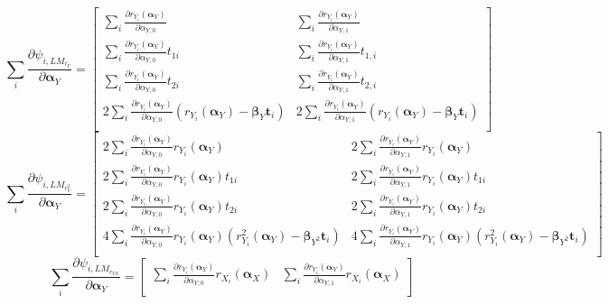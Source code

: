 \documentclass[]{article}
\begin{document}
{\small
{\[
\sum_i\frac{\partial \psi_{i,LM_{r_Y}}}{\partial \pmb{\alpha}_Y} = 
	\begin{bmatrix}
		\sum_i\frac{\partial r_{Y_i}(\pmb{\alpha}_Y)}{\partial \alpha_{Y,0}} & \sum_i\frac{\partial r_{Y_i}(\pmb{\alpha}_Y)}{\partial \alpha_{Y,1}}\\
		\sum_i\frac{\partial r_{Y_i}(\pmb{\alpha}_Y)}{\partial \alpha_{Y,0}}t_{1i} & \sum_i\frac{\partial r_{Y_i}(\pmb{\alpha}_Y)}{\partial \alpha_{Y,1}}t_{1,i}\\
		\sum_i\frac{\partial r_{Y_i}(\pmb{\alpha}_Y)}{\partial \alpha_{Y,0}}t_{2i} & \sum_i\frac{\partial r_{Y_i}(\pmb{\alpha}_Y)}{\partial \alpha_{Y,1}}t_{2,i}\\
		2\sum_i\frac{\partial r_{Y_i}(\pmb{\alpha}_Y)}{\partial \alpha_{Y,0}}(r_{Y_i}(\pmb{\alpha}_Y) - \pmb{\beta}_{Y}\pmb{t}_i) & 2\sum_i\frac{\partial r_{Y_i}(\pmb{\alpha}_Y)}{\partial \alpha_{Y,1}}(r_{Y_i}(\pmb{\alpha}_Y) - \pmb{\beta}_{Y}\pmb{t}_i)\\
 	\end{bmatrix} 
\]
\[
\sum_i\frac{\partial \psi_{i,LM_{r^2_Y}}}{\partial \pmb{\alpha}_Y} = 
	\begin{bmatrix}
		2\sum_i\frac{\partial r_{Y_i}(\pmb{\alpha}_Y)}{\partial \alpha_{Y,0}}r_{Y_i}(\pmb{\alpha}_Y) & 2\sum_i\frac{\partial r_{Y_i}(\pmb{\alpha}_Y)}{\partial \alpha_{Y,1}}r_{Y_i}(\pmb{\alpha}_Y)\\
		2\sum_i\frac{\partial r_{Y_i}(\pmb{\alpha}_Y)}{\partial \alpha_{Y,0}}r_{Y_i}(\pmb{\alpha}_Y)t_{1i} & 2\sum_i\frac{\partial r_{Y_i}(\pmb{\alpha}_Y)}{\partial \alpha_{Y,1}}r_{Y_i}(\pmb{\alpha}_Y)t_{1i}\\
		2\sum_i\frac{\partial r_{Y_i}(\pmb{\alpha}_Y)}{\partial \alpha_{Y,0}}r_{Y_i}(\pmb{\alpha}_Y)t_{2i} & 2\sum_i\frac{\partial r_{Y_i}(\pmb{\alpha}_Y)}{\partial \alpha_{Y,1}}r_{Y_i}(\pmb{\alpha}_Y)t_{2i}\\
		4\sum_i\frac{\partial r_{Y_i}(\pmb{\alpha}_Y)}{\partial \alpha_{Y,0}}r_{Y_i}(\pmb{\alpha}_Y)(r^2_{Y_i}(\pmb{\alpha}_Y) - \pmb{\beta}_{Y^2}\pmb{t}_i) & 4\sum_i\frac{\partial r_{Y_i}(\pmb{\alpha}_Y)}{\partial \alpha_{Y,1}}r_{Y_i}(\pmb{\alpha}_Y)(r^2_{Y_i}(\pmb{\alpha}_Y) - \pmb{\beta}_{Y^2}\pmb{t}_i)\\
 	\end{bmatrix} 
\]
\[
\sum_i\frac{\partial \psi_{i,LM_{r_{YX}}}}{\partial \pmb{\alpha}_Y} = 
	\begin{bmatrix}
		\sum_i\frac{\partial r_{Y_i}(\pmb{\alpha}_Y)}{\partial \alpha_{Y,0}}r_{X_i}(\pmb{\alpha}_X) & \sum_i\frac{\partial r_{Y_i}(\pmb{\alpha}_Y)}{\partial \alpha_{Y,1}}r_{X_i}(\pmb{\alpha}_X)\\

\end{bmatrix}\]}}
\end{document}
